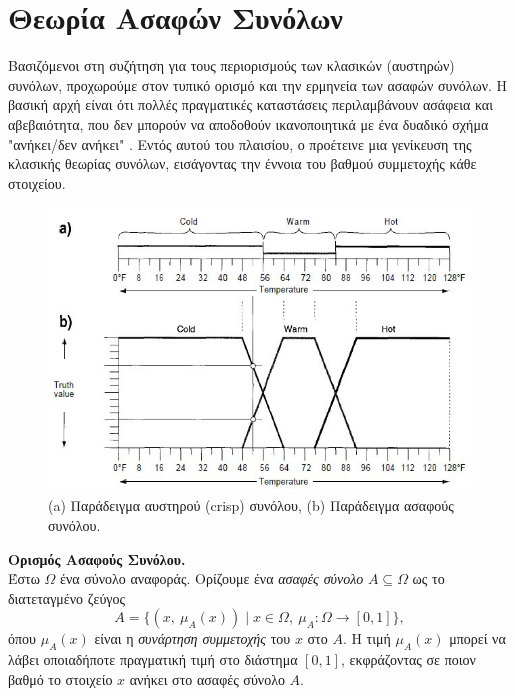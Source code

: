 \section{Θεωρία Ασαφών Συνόλων}
Βασιζόμενοι στη συζήτηση για τους περιορισμούς των κλασικών (αυστηρών) συνόλων, προχωρούμε στον τυπικό ορισμό και την ερμηνεία των ασαφών συνόλων. Η βασική αρχή είναι ότι πολλές πραγματικές καταστάσεις περιλαμβάνουν ασάφεια και αβεβαιότητα, που δεν μπορούν να αποδοθούν ικανοποιητικά με ένα δυαδικό σχήμα "ανήκει/δεν ανήκει" \cite{Zadeh1965,KlirYuan}. Εντός αυτού του πλαισίου, ο  προέτεινε μια γενίκευση της κλασικής θεωρίας συνόλων, εισάγοντας την έννοια του βαθμού συμμετοχής κάθε στοιχείου.

\begin{figure}[h!] \includegraphics[scale=0.7]{images/fuzzy_logic1.jpg} \centering \caption{(\textlatin{a}) Παράδειγμα αυστηρού (\textlatin{crisp}) συνόλου, (\textlatin{b}) Παράδειγμα ασαφούς συνόλου.} \label{char_fun1} \end{figure}

\medskip

\begin{definition}
	\label{def:fuzzyset}
	\textbf{Ορισμός Ασαφούς Συνόλου.}\\
	Έστω \(\Omega\) ένα σύνολο αναφοράς. Ορίζουμε ένα \emph{ασαφές σύνολο} \(A \subseteq \Omega\) ως το διατεταγμένο ζεύγος
	\begin{equation}
	\label{eq:1}
	A = \{(x,\ \mu_{A}(x)) \mid x \in \Omega,\ \mu_{A}: \Omega \rightarrow [0,1]\},
	\end{equation}
	όπου \(\mu_{A}(x)\) είναι η \emph{συνάρτηση συμμετοχής} του \(x\) στο \(A\). Η τιμή \(\mu_{A}(x)\) μπορεί να λάβει οποιαδήποτε πραγματική τιμή στο διάστημα \([0,1]\), εκφράζοντας σε ποιον βαθμό το στοιχείο \(x\) ανήκει στο ασαφές σύνολο \(A\).
\end{definition}

